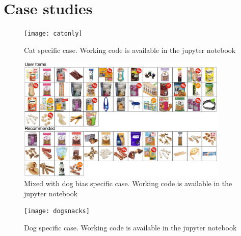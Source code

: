 \documentclass[12pt]{article}
\begin{document}
\section{Case studies}
\begin{figure}[h]
\caption{Cat specific case. Working code is available in the jupyter notebook}
\texttt{[image: catonly]}
\end{figure}
\newpage
\begin{figure}[h]
\caption{Mixed with dog bias specific case. Working code is available in the jupyter notebook}
\includegraphics[width=0.9\textwidth]{dogplussomecat}
\end{figure}
\newpage
\begin{figure}[h]
\caption{Dog specific case. Working code is available in the jupyter notebook}
\texttt{[image: dogsnacks]}
\end{figure}
\newpage
\end{document}
